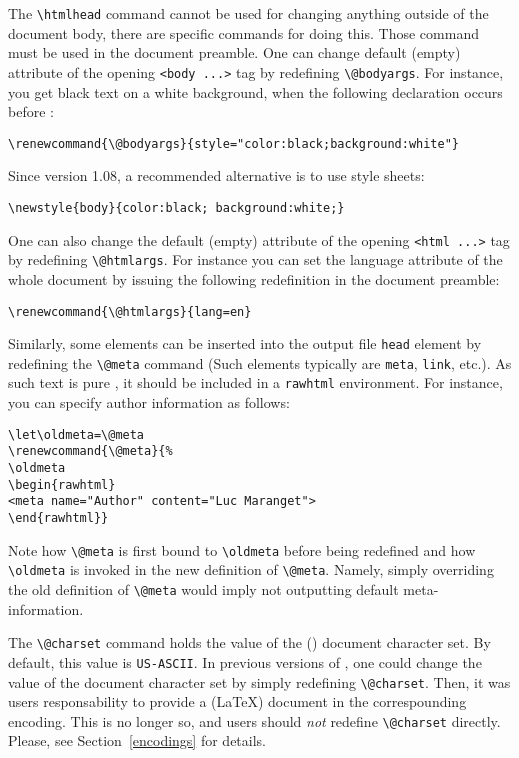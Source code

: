 \label{metadef}
The \verb+\htmlhead+ command cannot be used for changing anything outside of
the \html{} document body, there are specific commands for doing this.
Those command must be used in the document preamble.
One can
change \hevea{} default (empty) attribute of
the opening \verb+<body ...>+ tag by redefining
\verb+\@bodyargs+.
For instance, you get black text on a white background, when the
following declaration occurs before \verb++:
\begin{verbatim}
\renewcommand{\@bodyargs}{style="color:black;background:white"}
\end{verbatim}
Since version 1.08, a recommended alternative is to use style sheets:
\begin{verbatim}
\newstyle{body}{color:black; background:white;}
\end{verbatim}

One can also change the default (empty) attribute of the opening
\verb+<html ...>+ tag by redefining
\verb+\@htmlargs+. For instance you can set the language attribute
of the whole document by issuing the following redefinition in
the document preamble:
\begin{verbatim}
\renewcommand{\@htmlargs}{lang=en}
\end{verbatim}

\label{exlet}Similarly, some elements can be inserted into the output file
\verb+head+ element by redefining the \verb+\@meta+ command
(Such elements typically are \verb+meta+, \verb+link+, etc.).
As such text is pure \html{}, it should be included in a
\verb+rawhtml+ environment. For instance, you can specify
author information as follows:
\begin{verbatim}
\let\oldmeta=\@meta
\renewcommand{\@meta}{%
\oldmeta
\begin{rawhtml}
<meta name="Author" content="Luc Maranget">
\end{rawhtml}}
\end{verbatim}
Note how \verb+\@meta+ is first bound to
\verb+\oldmeta+ before being redefined and how \verb+\oldmeta+ is
invoked in the new definition of \verb+\@meta+.
Namely, simply overriding the old definition of \verb+\@meta+ would
imply not outputting default meta-information.

The \verb+\@charset+ command holds the value of the (\html) document character
set. By default, this value is \texttt{US-ASCII}.
In previous versions of \hevea{}, one could change the
value of the document character set by simply redefining
\verb+\@charset+. Then, it was users responsability to provide a
(\LaTeX) document in the correspounding encoding.
This is no longer so, and users should \emph{not} redefine
\verb+\@charset+ directly. Please, see Section~\ref{encodings} for details.


